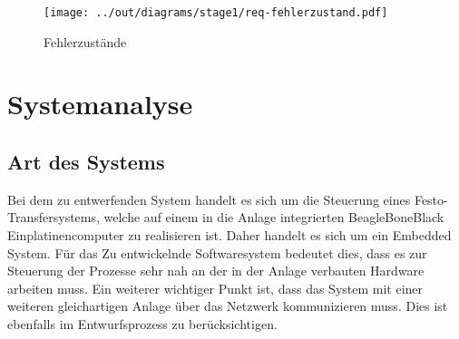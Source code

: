 


























\begin{figure}
    \centering
    \texttt{[image: ../out/diagrams/stage1/req-fehlerzustand.pdf]}
    \caption{Fehlerzustände}
    \label{fig:stm_fehler}
\end{figure}



\section{Systemanalyse}\label{sec:systemanalyse}


\subsection{Art des Systems}

Bei dem zu entwerfenden System handelt es sich um die Steuerung eines Festo-Transfersystems, welche auf einem in die Anlage integrierten BeagleBoneBlack Einplatinencomputer zu realisieren ist.
Daher handelt es sich um ein Embedded System.
Für das Zu entwickelnde Softwaresystem bedeutet dies, dass es zur Steuerung der Prozesse sehr nah an der in der Anlage verbauten Hardware arbeiten muss.
Ein weiterer wichtiger Punkt ist, dass das System mit einer weiteren gleichartigen Anlage über das Netzwerk kommunizieren muss. Dies ist ebenfalls im Entwurfsprozess zu berücksichtigen.

